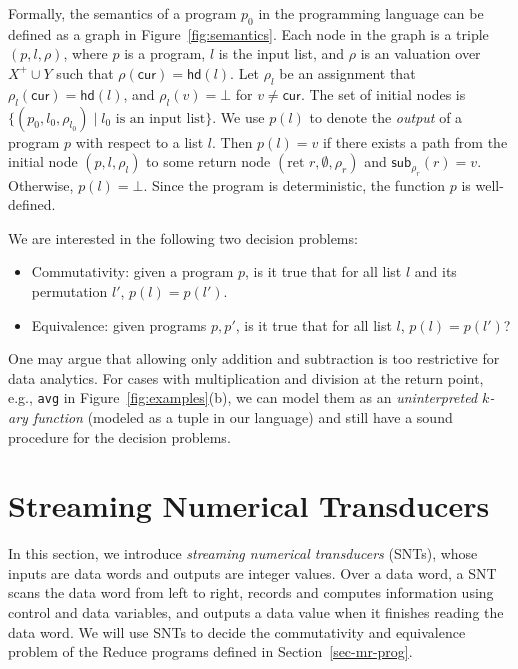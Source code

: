 \documentclass[runningheads,a4paper]{llncs}
\newcommand\cur{\mathsf{cur}}
\newcommand\head{\mathsf{hd}}
\newcommand{\sub}[2]{\mathsf{sub}_{#2}(#1)}
\begin{document}
Formally, the semantics of a program $p_0$ in the programming language can be defined as a graph in Figure~\ref{fig:semantics}. Each node in the graph is a triple $(p,l,\rho)$, where $p$ is a program, $l$ is the input list, and $\rho$ is an valuation over $X^+\cup Y$ such that $\rho(\cur)=\head(l)$. Let $\rho_l$ be an assignment that $\rho_l(\cur)=\head(l)$, and $\rho_l(v)=\bot$ for $v\neq \cur$.
The set of initial nodes is $\{(p_0,l_0,\rho_{l_0})\mid l_0\mbox{ is an input list}\}$.
We use $p(l)$ to denote the \emph{output} of a program $p$ with respect to a list $l$. Then $p(l) =v$ if there exists a path from the initial node $(p, l, \rho_l)$ to some return node $(\mbox{ret }r,  \emptyset, \rho_r)$ and $\sub{r}{\rho_r}=v$. Otherwise, $p(l)=\bot$. Since the program is deterministic, the function $p$ is well-defined. 

We are interested in the following two decision problems:
\begin{itemize}
	\item Commutativity: given a program $p$, is it true that for all list $l$ and its permutation $l'$, $p(l) = p(l')$.
	\item Equivalence: given programs $p,p'$, is it true that for all list $l$, $p(l)=p(l')$?
\end{itemize}

One may argue that allowing only addition and subtraction is too restrictive for data analytics. For cases with multiplication and division at the return point, e.g., \texttt{avg} in Figure~\ref{fig:examples}(b), we can model them as an \emph{uninterpreted $k$-ary function}  (modeled as a tuple in our language) and still have a sound procedure for the decision problems. 






\section{Streaming Numerical Transducers}\label{sec-def-snt}

In this section, we introduce \emph{streaming numerical transducers} (SNTs), whose inputs are data words and outputs are integer values. Over a data word, a SNT scans the data word from left to right, records and computes information using control and data variables, and outputs a data value when it finishes reading the data word. We will use SNTs to decide the commutativity and equivalence problem of the Reduce programs defined in Section~\ref{sec-mr-prog}.
\end{document}
